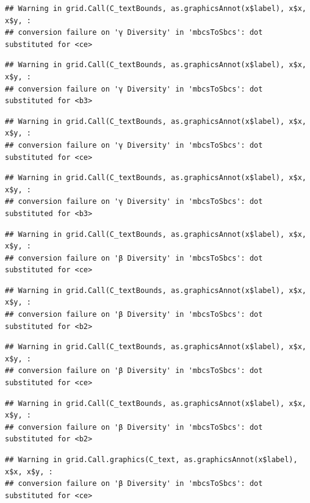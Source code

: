 \documentclass[
]{article}
\begin{document}
\begin{verbatim}
## Warning in grid.Call(C_textBounds, as.graphicsAnnot(x$label), x$x, x$y, :
## conversion failure on 'γ Diversity' in 'mbcsToSbcs': dot substituted for <ce>
\end{verbatim}

\begin{verbatim}
## Warning in grid.Call(C_textBounds, as.graphicsAnnot(x$label), x$x, x$y, :
## conversion failure on 'γ Diversity' in 'mbcsToSbcs': dot substituted for <b3>
\end{verbatim}

\begin{verbatim}
## Warning in grid.Call(C_textBounds, as.graphicsAnnot(x$label), x$x, x$y, :
## conversion failure on 'γ Diversity' in 'mbcsToSbcs': dot substituted for <ce>
\end{verbatim}

\begin{verbatim}
## Warning in grid.Call(C_textBounds, as.graphicsAnnot(x$label), x$x, x$y, :
## conversion failure on 'γ Diversity' in 'mbcsToSbcs': dot substituted for <b3>
\end{verbatim}

\begin{verbatim}
## Warning in grid.Call(C_textBounds, as.graphicsAnnot(x$label), x$x, x$y, :
## conversion failure on 'β Diversity' in 'mbcsToSbcs': dot substituted for <ce>
\end{verbatim}

\begin{verbatim}
## Warning in grid.Call(C_textBounds, as.graphicsAnnot(x$label), x$x, x$y, :
## conversion failure on 'β Diversity' in 'mbcsToSbcs': dot substituted for <b2>
\end{verbatim}

\begin{verbatim}
## Warning in grid.Call(C_textBounds, as.graphicsAnnot(x$label), x$x, x$y, :
## conversion failure on 'β Diversity' in 'mbcsToSbcs': dot substituted for <ce>
\end{verbatim}

\begin{verbatim}
## Warning in grid.Call(C_textBounds, as.graphicsAnnot(x$label), x$x, x$y, :
## conversion failure on 'β Diversity' in 'mbcsToSbcs': dot substituted for <b2>
\end{verbatim}

\begin{verbatim}
## Warning in grid.Call.graphics(C_text, as.graphicsAnnot(x$label), x$x, x$y, :
## conversion failure on 'β Diversity' in 'mbcsToSbcs': dot substituted for <ce>
\end{verbatim}
\end{document}
